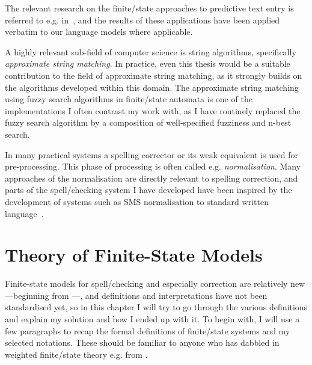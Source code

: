 \documentclass[officiallayout]{unihelcompling}
\begin{document}
The relevant research on the finite\-/state approaches to predictive text entry
is referred to e.g. in~\citep{silfverberg2010partofspeech,forcada2001corpus},
and the results of
these applications have been applied verbatim to our language models where
applicable.

A highly relevant sub-field of computer science is string algorithms,
specifically \emph{approximate string matching}. In practice, even this thesis
would be a suitable contribution to the field of approximate string matching,
as it strongly builds on the algorithms developed within this domain. The
approximate string matching using fuzzy search algorithms in finite\-/state
automata is one of the implementations I often contrast my work with, as I have
routinely replaced the fuzzy search algorithm by a composition of
well-specified fuzziness and n-best search.

In many practical systems a spelling corrector or its weak equivalent is used
for pre-processing. This phase of processing is often called e.g.
\emph{normalisation}. Many approaches of the normalisation are directly
relevant to spelling correction, and parts of the spell\-/checking system I
have developed have been inspired by the development of systems such as
SMS normalisation to standard written language~\citep{kobus2008normalizing}.

\section{Theory of Finite-State Models}
\label{sec:finite-state-theory}

Finite-state models for spell\-/checking and especially correction are relatively
new---beginning from \citep{oflazer1996errortolerant}---, and
definitions and interpretations have not been standardised yet, so in this
chapter I will try to go through the various definitions and explain my
solution and how I ended up with it. To begin with, I will use a few paragraphs
to recap the formal definitions of finite\-/state systems and my selected
notations. These should be familiar to anyone who has dabbled in weighted
finite\-/state theory e.g. from \citet{aho2007compilers,mohri1997finitestate}.
\end{document}
